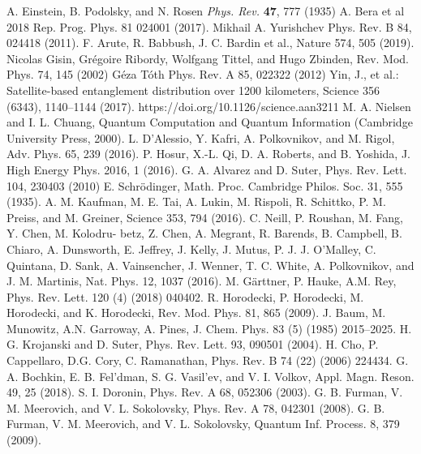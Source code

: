 \begin{thebibliography}{}
  A. Einstein, B. Podolsky, and N. Rosen \textit{Phys. Rev.} \textbf{47}, 777 (1935)
  A. Bera et al 2018 Rep. Prog. Phys. 81 024001 (2017).
  Mikhail A. Yurishchev Phys. Rev. B 84, 024418 (2011).
  F. Arute, R. Babbush, J. C. Bardin et al., Nature 574, 505 (2019).
  Nicolas Gisin, Grégoire Ribordy, Wolfgang Tittel, and Hugo Zbinden, Rev. Mod. Phys. 74, 145 (2002)
  G\'eza T\'oth Phys. Rev. A 85, 022322 (2012)
  Yin, J., et al.: Satellite-based entanglement distribution over 1200 kilometers, Science 356 (6343), 1140–1144 (2017). https://doi.org/10.1126/science.aan3211
  M. A. Nielsen and I. L. Chuang, Quantum Computation and Quantum Information (Cambridge University Press, 2000).
  L. D’Alessio, Y. Kafri, A. Polkovnikov, and M. Rigol, Adv. Phys. 65, 239 (2016).
  P. Hosur, X.-L. Qi, D. A. Roberts, and B. Yoshida, J. High Energy Phys. 2016, 1 (2016).
  G. A. Alvarez and D. Suter, Phys. Rev. Lett. 104, 230403 (2010)
  E. Schr\"odinger, Math. Proc. Cambridge Philos. Soc. 31, 555 (1935).
  A. M. Kaufman, M. E. Tai, A. Lukin, M. Rispoli, R. Schittko, P. M. Preiss, and M. Greiner, Science 353, 794 (2016).
  C. Neill, P. Roushan, M. Fang, Y. Chen, M. Kolodru- betz, Z. Chen, A. Megrant, R. Barends, B. Campbell, B. Chiaro, A. Dunsworth, E. Jeffrey, J. Kelly, J. Mutus, P. J. J. O’Malley, C. Quintana, D. Sank, A. Vainsencher, J. Wenner, T. C. White, A. Polkovnikov, and J. M. Martinis, Nat. Phys. 12, 1037 (2016).
  M. G\"arttner, P. Hauke, A.M. Rey, Phys. Rev. Lett. 120 (4) (2018) 040402.
  R. Horodecki, P. Horodecki, M. Horodecki, and K. Horodecki, Rev. Mod. Phys. 81, 865 (2009).
  J. Baum, M. Munowitz, A.N. Garroway, A. Pines, J. Chem. Phys. 83 (5) (1985) 2015–2025.
  H. G. Krojanski and D. Suter, Phys. Rev. Lett. 93, 090501 (2004).
  H. Cho, P. Cappellaro, D.G. Cory, C. Ramanathan, Phys. Rev. B 74 (22) (2006) 224434.
  G. A. Bochkin, E. B. Fel’dman, S. G. Vasil’ev, and V. I. Volkov, Appl. Magn. Reson. 49, 25 (2018).
  S. I. Doronin, Phys. Rev. A 68, 052306 (2003).
  G. B. Furman, V. M. Meerovich, and V. L. Sokolovsky, Phys. Rev. A 78, 042301 (2008).
  G. B. Furman, V. M. Meerovich, and V. L. Sokolovsky, Quantum Inf. Process. 8, 379 (2009).

\end{thebibliography}
